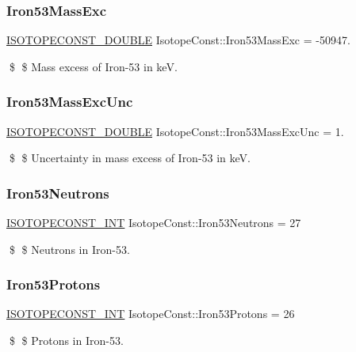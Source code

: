 \subsubsection{\texorpdfstring{Iron53\+Mass\+Exc}{Iron53MassExc}}
{\footnotesize\ttfamily \mbox{\hyperlink{group___isotope_const-_macros_ga8f45a7272ce02c0b4c65c44636ed719a}{I\+S\+O\+T\+O\+P\+E\+C\+O\+N\+S\+T\+\_\+\+D\+O\+U\+B\+LE}} Isotope\+Const\+::\+Iron53\+Mass\+Exc = -\/50947.}

\$ \$ Mass excess of Iron-\/53 in keV. \mbox{\label{group___isotope_const-_iron-_fe53_ga42d9b83aa66e4f786ac8c43cd116bca7}} 
\subsubsection{\texorpdfstring{Iron53\+Mass\+Exc\+Unc}{Iron53MassExcUnc}}
{\footnotesize\ttfamily \mbox{\hyperlink{group___isotope_const-_macros_ga8f45a7272ce02c0b4c65c44636ed719a}{I\+S\+O\+T\+O\+P\+E\+C\+O\+N\+S\+T\+\_\+\+D\+O\+U\+B\+LE}} Isotope\+Const\+::\+Iron53\+Mass\+Exc\+Unc = 1.}

\$ \$ Uncertainty in mass excess of Iron-\/53 in keV. \mbox{\label{group___isotope_const-_iron-_fe53_ga98252c22bc5dbf9e12444a2b745c0ee1}} 
\subsubsection{\texorpdfstring{Iron53\+Neutrons}{Iron53Neutrons}}
{\footnotesize\ttfamily \mbox{\hyperlink{group___isotope_const-_macros_ga5f18360b3e99483a35c32d789e62621c}{I\+S\+O\+T\+O\+P\+E\+C\+O\+N\+S\+T\+\_\+\+I\+NT}} Isotope\+Const\+::\+Iron53\+Neutrons = 27}

\$ \$ Neutrons in Iron-\/53. \mbox{\label{group___isotope_const-_iron-_fe53_gaf7b1c72882529f91d55953b6a13cb597}} 
\subsubsection{\texorpdfstring{Iron53\+Protons}{Iron53Protons}}
{\footnotesize\ttfamily \mbox{\hyperlink{group___isotope_const-_macros_ga5f18360b3e99483a35c32d789e62621c}{I\+S\+O\+T\+O\+P\+E\+C\+O\+N\+S\+T\+\_\+\+I\+NT}} Isotope\+Const\+::\+Iron53\+Protons = 26}

\$ \$ Protons in Iron-\/53. 